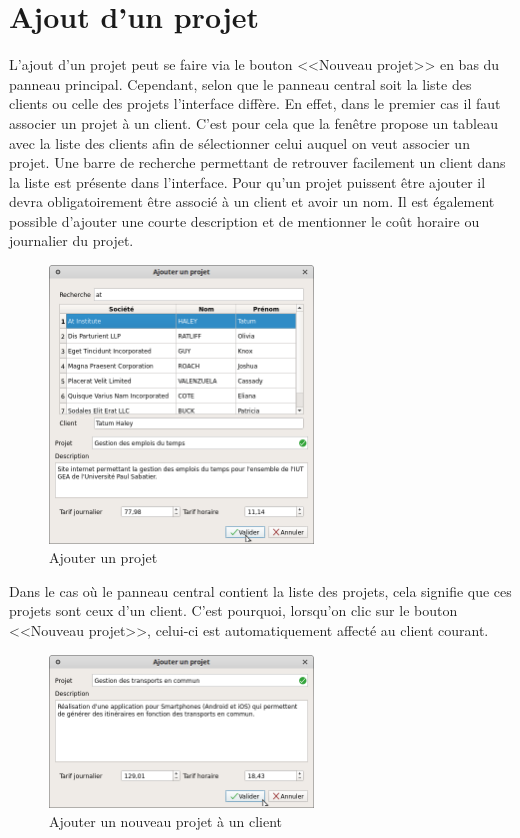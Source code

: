 \section{Ajout d'un projet}
L'ajout d’un projet peut se faire via le bouton <<Nouveau projet>> en bas du panneau principal.
Cependant, selon que le panneau central soit la liste des clients ou celle des projets l'interface diffère. En effet, dans le premier cas il faut associer un projet à un client. 
C'est pour cela que la fenêtre propose un tableau avec la liste des clients afin de sélectionner celui auquel on veut associer un projet. 
Une barre de recherche permettant de retrouver facilement un client dans la liste est présente dans l'interface. Pour qu'un projet puissent être ajouter il devra obligatoirement être associé à un client et avoir un nom. 
Il est également possible d'ajouter une courte description et de mentionner le coût horaire ou journalier du projet. 
\begin{figure}[H]
	\centering
	\includegraphics[width=7cm]{screens/ajouterProjet.png}
	\caption{Ajouter un projet}
\end{figure}
Dans le cas où le panneau central contient la liste des projets, cela signifie que ces projets sont ceux d'un client. C'est pourquoi, lorsqu'on clic sur le bouton <<Nouveau projet>>, celui-ci est automatiquement affecté au client courant. 
\begin{figure}[H]
	\centering
	\includegraphics[width=7cm]{screens/ajouterProjetClient.png}
	\caption{Ajouter un nouveau projet à un client}
\end{figure}

